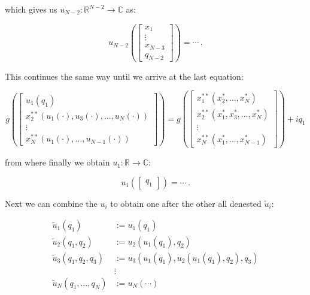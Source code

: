 \documentclass[a4paper,10pt]{article}
\begin{document}
which gives us $u_{N-2}:\mathbb{R}^{N-2} \rightarrow \mathbb{C}$ as:

\begin{equation} \nonumber
 u_{N-2}\left(
 \begin{bmatrix}
  x_1 \\ \vdots \\ x_{N-3} \\ q_{N-2}
 \end{bmatrix}
 \right) = \cdots \,.
\end{equation}

This continues the same way until we arrive at the last equation:

\begin{equation} \nonumber
 g\left(
 \begin{bmatrix}
  u_1(q_1) \\
  x_2^{**}(u_1(\cdot), u_3(\cdot), \ldots, u_{N}(\cdot)) \\
  \vdots\\
  x_N^{**}(u_1(\cdot), \ldots, u_{N-1}(\cdot))
 \end{bmatrix}
 \right)
 = g\left(
 \begin{bmatrix}
  x_1^{**}(x_2^{*}, \ldots, x_{N}^{*}) \\
  x_2^{**}(x_1^{*}, x_3^{*}, \ldots, x_{N}^{*}) \\
  \vdots
  \\ x_{N}^{**}(x_1^{*}, \ldots, x_{N-1}^{*})
 \end{bmatrix}
 \right)
 +i q_1
\end{equation}

from where finally we obtain $u_1:\mathbb{R} \rightarrow \mathbb{C}$:

\begin{equation} \nonumber
 u_1\left(
 \begin{bmatrix}
  q_1
 \end{bmatrix}
 \right) = \cdots \,.
\end{equation}


Next we can combine the $u_i$ to obtain one after the other all denested $\tilde{u}_i$:

\begin{equation}
\begin{split}
 \tilde{u}_1(q_1)              & := u_1(q_1) \\
 \tilde{u}_2(q_1, q_2)         & := u_2(u_1(q_1), q_2) \\
 \tilde{u}_3(q_1, q_2, q_3)    & := u_3(u_1(q_1), u_2(u_1(q_1), q_2), q_3) \\
                               & \vdots \\
 \tilde{u}_N(q_1, \ldots, q_N) & := u_N(\cdots)
\end{split}
\end{equation}
\end{document}
